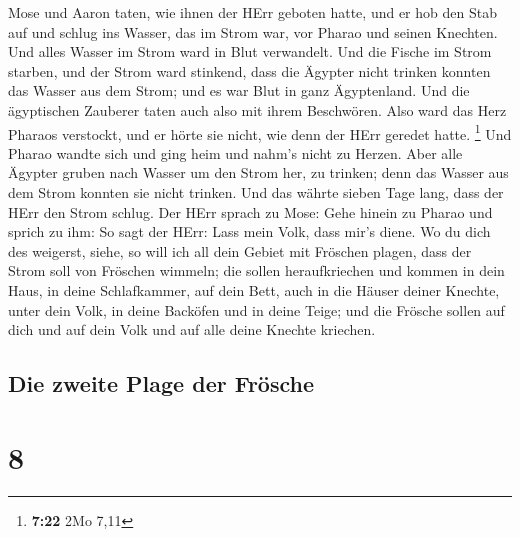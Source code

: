  Mose und Aaron taten, wie ihnen der HErr geboten hatte,
und er hob den Stab auf und schlug ins Wasser, das im Strom war, vor
Pharao und seinen Knechten. Und alles Wasser im Strom ward in Blut
verwandelt.  Und die Fische im Strom starben, und der
Strom ward stinkend, dass die Ägypter nicht trinken konnten das Wasser
aus dem Strom; und es war Blut in ganz Ägyptenland.  Und
die ägyptischen Zauberer taten auch also mit ihrem Beschwören. Also ward
das Herz Pharaos verstockt, und er hörte sie nicht, wie denn der HErr
geredet hatte. \footnote{\textbf{7:22} 2Mo 7,11}  Und
Pharao wandte sich und ging heim und nahm's nicht zu Herzen.
 Aber alle Ägypter gruben nach Wasser um den Strom her,
zu trinken; denn das Wasser aus dem Strom konnten sie nicht trinken.
 Und das währte sieben Tage lang, dass der HErr den Strom
schlug.  Der HErr sprach zu Mose: Gehe hinein zu Pharao
und sprich zu ihm: So sagt der HErr: Lass mein Volk, dass mir's diene.
 Wo du dich des weigerst, siehe, so will ich all dein
Gebiet mit Fröschen plagen,  dass der Strom soll von
Fröschen wimmeln; die sollen heraufkriechen und kommen in dein Haus, in
deine Schlafkammer, auf dein Bett, auch in die Häuser deiner Knechte,
unter dein Volk, in deine Backöfen und in deine Teige; 
und die Frösche sollen auf dich und auf dein Volk und auf alle deine
Knechte kriechen.

\hypertarget{die-zweite-plage-der-fruxf6sche}{%
\subsection{Die zweite Plage der
Frösche}\label{die-zweite-plage-der-fruxf6sche}}

\hypertarget{section-7}{%
\section{8}\label{section-7}}

